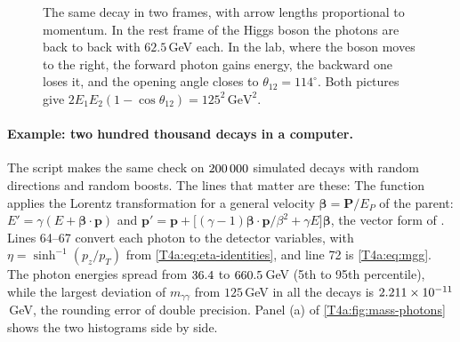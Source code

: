 \begin{figure}[htbp]
\centering
{}
\caption{The same decay in two frames, with arrow lengths proportional to momentum. In the rest frame of the Higgs boson the photons are back to back with $62.5$\,GeV each. In the lab, where the boson moves to the right, the forward photon gains energy, the backward one loses it, and the opening angle closes to $\theta_{12}=114^\circ$. Both pictures give $2E_1E_2(1-\cos\theta_{12})=125^2\,\mathrm{GeV}^2$.}
\label{T4a:fig:decay-frames}
\end{figure}

\paragraph{Example: two hundred thousand decays in a computer.}
The script  makes the same check on $\num{200000}$ simulated decays with random directions and random boosts. The lines that matter are these:
The function  applies the Lorentz transformation for a general velocity $\bm\beta=\bm P/E_P$ of the parent: $E'=\gamma(E+\bm\beta\cdot\bm p)$ and $\bm p'=\bm p+\bigl[(\gamma-1)\bm\beta\cdot\bm p/\beta^2+\gamma E\bigr]\bm\beta$, the vector form of \cite[(49.1)]{PDG2024}. Lines 64--67 convert each photon to the detector variables, with $\eta=\sinh^{-1}(p_z/p_T)$ from \eqref{T4a:eq:eta-identities}, and line 72 is \eqref{T4a:eq:mgg}. The photon energies spread from $\tfouraR{1}{\TfElo}$ to $\tfouraR{1}{\TfEhi}$\,GeV (5th to 95th percentile), while the largest deviation of $m_{\gamma\gamma}$ from $125$\,GeV in all the decays is $2.211\times10^{-11}$\,GeV, the rounding error of double precision. Panel (a) of \cref{T4a:fig:mass-photons} shows the two histograms side by side.

